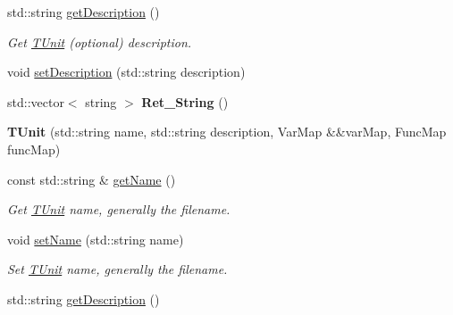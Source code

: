 \begin{DoxyCompactItemize}
std\+::string \hyperlink{classspan_1_1ir_1_1tunit_1_1TUnit_ad896bdfde696ce84b09a21eca27ad97d}{get\+Description} ()
\begin{DoxyCompactList}\small\item\em Get \hyperlink{classspan_1_1ir_1_1tunit_1_1TUnit}{T\+Unit} (optional) description. \end{DoxyCompactList}\item 
void \hyperlink{classspan_1_1ir_1_1tunit_1_1TUnit_a7282396b2197abecf4be7b83232de887}{set\+Description} (std\+::string description)
\item 
\mbox{\label{classspan_1_1ir_1_1tunit_1_1TUnit_a8a459d7ce6e0bea270c6a5b85dd760d3}} 
std\+::vector$<$ string $>$ {\bfseries Ret\+\_\+\+String} ()
\item 
\mbox{\label{classspan_1_1ir_1_1tunit_1_1TUnit_a38b571a7c30b503bc67a2c64f0f9f8b8}} 
{\bfseries T\+Unit} (std\+::string name, std\+::string description, Var\+Map \&\&var\+Map, Func\+Map func\+Map)
\item 
\mbox{\label{classspan_1_1ir_1_1tunit_1_1TUnit_a2a224cfa26d81e169f2b3b36e3176562}} 
const std\+::string \& \hyperlink{classspan_1_1ir_1_1tunit_1_1TUnit_a2a224cfa26d81e169f2b3b36e3176562}{get\+Name} ()
\begin{DoxyCompactList}\small\item\em Get \hyperlink{classspan_1_1ir_1_1tunit_1_1TUnit}{T\+Unit} name, generally the filename. \end{DoxyCompactList}\item 
\mbox{\label{classspan_1_1ir_1_1tunit_1_1TUnit_aafb230fac04e8d88606257223a21d198}} 
void \hyperlink{classspan_1_1ir_1_1tunit_1_1TUnit_aafb230fac04e8d88606257223a21d198}{set\+Name} (std\+::string name)
\begin{DoxyCompactList}\small\item\em Set \hyperlink{classspan_1_1ir_1_1tunit_1_1TUnit}{T\+Unit} name, generally the filename. \end{DoxyCompactList}\item 
\mbox{\label{classspan_1_1ir_1_1tunit_1_1TUnit_ae80082eafb1c5ab45732473730d681a8}} 
std\+::string \hyperlink{classspan_1_1ir_1_1tunit_1_1TUnit_ae80082eafb1c5ab45732473730d681a8}{get\+Description} ()

\end{DoxyCompactItemize}
